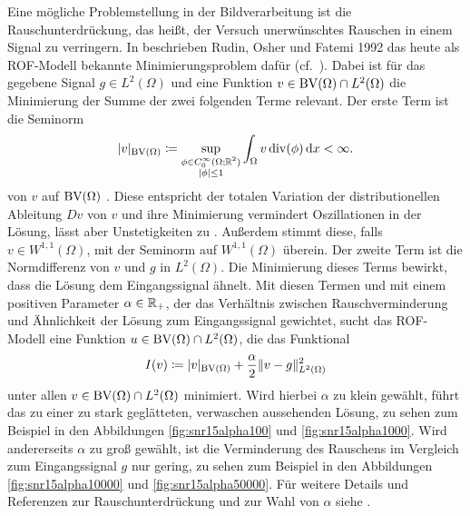 Eine mögliche Problemstellung in der Bildverarbeitung ist die
Rauschunterdrü\-ckung, das heißt, der Versuch unerwünschtes Rauschen in einem
Signal zu verringern.
In \cite{ROF92} beschrieben Rudin, Osher und Fatemi 1992 das heute als
ROF-Modell bekannte Minimierungsproblem dafür (cf.\
\cites[1217]{Bar15a}[132]{CP10}[S. 74 f.]{Get12}).
Dabei ist für das gegebene Signal $g\in L^2(\Omega)$ und 
eine Funktion $v\in\textup{BV}(\Omega)\cap L^2(\Omega)$ die Minimierung
der Summe der zwei folgenden Terme relevant.
Der erste Term ist die
Seminorm
\begin{align*}
  |v|_{\textup{BV}(\Omega)}
  \coloneqq
  \sup_{\substack{\phi\in C^\infty_0(\Omega;\mathbb{R}^2)\\
  |\phi|\leq 1}}\int_\Omega v\operatorname{div} (\phi)\,\mathrm{d}x
  <
  \infty.
\end{align*}
von $v$ auf $\textup{BV}(\Omega)$ \cite[1162]{Bar12}. Diese entspricht der
totalen Variation der distributionellen Ableitung $Dv$ von $v$ und
ihre Minimierung vermindert Oszillationen in der Lösung, lässt aber
Unstetigkeiten zu \cite[75]{Get12}.
Außerdem stimmt diese, falls $v\in W^{1,1}(\Omega)$, mit der Seminorm auf
$W^{1,1}(\Omega)$ überein. 
Der zweite Term ist die Normdifferenz von $v$ und $g$ in $L^2(\Omega)$. 
Die Minimierung dieses Terms bewirkt, dass die Lösung dem Eingangssignal
ähnelt.
Mit diesen Termen und mit einem positiven Parameter
$\alpha\in\mathbb{R}_+$, der das Verhältnis zwischen Rauschverminderung und
Ähnlichkeit der Lösung zum Eingangssignal gewichtet, sucht das ROF-Modell
eine Funktion $u\in\textup{BV}(\Omega)\cap L^2(\Omega)$, die das Funktional
\begin{align}
  \label{eq:rofModel}
  I(v)\coloneqq |v|_{\textup{BV}(\Omega)}+\frac{\alpha}{2}\Vert
  v-g\Vert_{L^2(\Omega)}^2
\end{align}
unter allen $v\in\textup{BV}(\Omega)\cap L^2(\Omega)$ minimiert.
Wird hierbei $\alpha$ zu klein gewählt, führt das zu einer zu stark
geglätteten, verwaschen aussehenden Lösung, zu sehen zum Beispiel in den
Abbildungen \ref{fig:snr15alpha100} und \ref{fig:snr15alpha1000}. 
Wird andererseits $\alpha$ zu groß gewählt, ist die Verminderung des Rauschens
im Vergleich zum Eingangssignal $g$ nur gering, zu sehen zum Beispiel in den
Abbildungen \ref{fig:snr15alpha10000} und \ref{fig:snr15alpha50000}.
Für weitere Details und Referenzen zur Rauschunterdrückung und zur Wahl von
$\alpha$ siehe \cite{Get12}.

